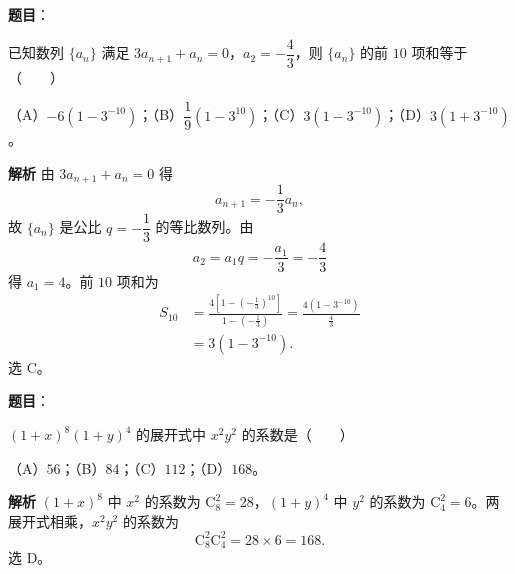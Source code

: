 \begin{answer}

\textbf{题目}：

已知数列 $\{a_n\}$ 满足 $3a_{n+1}+a_n=0$，$a_2=-\dfrac43$，则 $\{a_n\}$ 的前 $10$ 项和等于\mbox{（　　）}

（A）$-6(1-3^{-10})$；（B）$\dfrac19(1-3^{10})$；（C）$3(1-3^{-10})$；（D）$3(1+3^{-10})$。

\textbf{解析}
由 $3a_{n+1}+a_n=0$ 得
\nopagebreak[4]
\[a_{n+1}=-\frac13a_n,\]
故 $\{a_n\}$ 是公比 $q=-\dfrac13$ 的等比数列。由
\nopagebreak[4]
\[a_2=a_1q=-\frac{a_1}3=-\frac43\]
得 $a_1=4$。前 $10$ 项和为
\nopagebreak[4]
\[\begin{aligned}
S_{10}
&=\frac{4\left[1-\left(-\frac13\right)^{10}\right]}{1-\left(-\frac13\right)}
=\frac{4\left(1-3^{-10}\right)}{\frac43}\\
&=3\left(1-3^{-10}\right).
\end{aligned}\]
选 C。


\end{answer}
\begin{answer}

\textbf{题目}：

$(1+x)^8(1+y)^4$ 的展开式中 $x^2y^2$ 的系数是\mbox{（　　）}

（A）$56$；（B）$84$；（C）$112$；（D）$168$。

\textbf{解析}
$(1+x)^8$ 中 $x^2$ 的系数为 $\mathrm C_8^2=28$，$(1+y)^4$ 中 $y^2$ 的系数为 $\mathrm C_4^2=6$。两展开式相乘，$x^2y^2$ 的系数为
\nopagebreak[4]
\[\mathrm C_8^2\mathrm C_4^2=28\times6=168.\]
选 D。


\end{answer}
